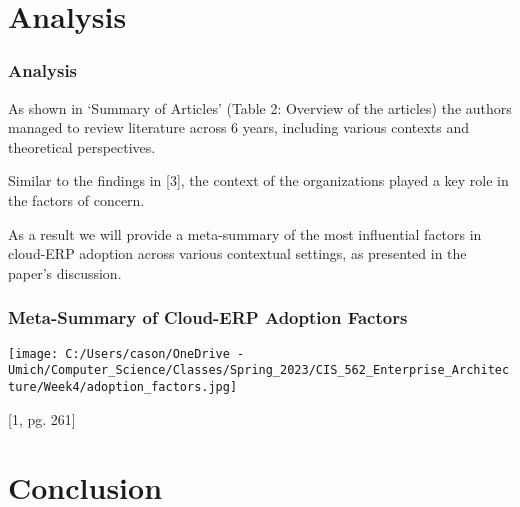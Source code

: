 \documentclass{beamer}
\begin{document}

\section{Analysis}

\begin{frame}

    \frametitle{Analysis}

    As shown in `Summary of Articles' (Table 2: Overview of the articles) the authors managed to review literature across 6 years, including various contexts and theoretical perspectives. \pause

    \vspace{5mm}
    Similar to the findings in [3], the context of the organizations played a key role in the factors of concern. \pause

    \vspace{5mm}
    As a result we will provide a meta-summary of the most influential factors in cloud-ERP adoption across various contextual settings, as presented in the paper's discussion. 

\end{frame}

\begin{frame}

    \frametitle{Meta-Summary of Cloud-ERP Adoption Factors}

    \centering
    \texttt{[image: C:/Users/cason/OneDrive - Umich/Computer\_Science/Classes/Spring\_2023/CIS\_562\_Enterprise\_Architecture/Week4/adoption\_factors.jpg]}

    \footnotesize {[1, pg. 261]}

\end{frame}


\section{Conclusion}
\end{document}
